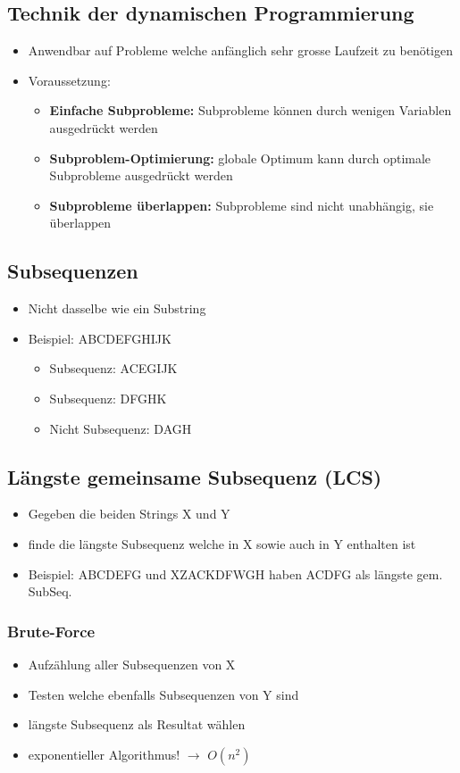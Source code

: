 \subsection{Technik der dynamischen Programmierung}
\begin{itemize}
    \item Anwendbar auf Probleme welche anfänglich sehr grosse Laufzeit zu benötigen
    \item Voraussetzung:
    \begin{itemize}
        \item \textbf{Einfache Subprobleme:} Subprobleme können durch wenigen Variablen ausgedrückt werden
        \item \textbf{Subproblem-Optimierung:} globale Optimum kann durch optimale Subprobleme ausgedrückt werden
        \item \textbf{Subprobleme überlappen: }Subprobleme sind nicht unabhängig, sie überlappen
    \end{itemize}
\end{itemize}

\subsection{Subsequenzen}
\begin{itemize}
    \item Nicht dasselbe wie ein Substring
    \item Beispiel: ABCDEFGHIJK
    \begin{itemize}
        \item Subsequenz: ACEGIJK
        \item Subsequenz: DFGHK
        \item Nicht Subsequenz: DAGH
    \end{itemize}
\end{itemize}

\subsection{Längste gemeinsame Subsequenz (LCS)}
\begin{itemize}
    \item Gegeben die beiden Strings X und Y
    \item finde die längste Subsequenz welche in X sowie auch in Y enthalten ist
    \item Beispiel: ABCDEFG und XZACKDFWGH haben ACDFG als längste gem. SubSeq.
\end{itemize}
\subsubsection{Brute-Force}
\begin{itemize}
    \item Aufzählung aller Subsequenzen von X
    \item Testen welche ebenfalls Subsequenzen von Y sind
    \item längste Subsequenz als Resultat wählen
    \item exponentieller Algorithmus! $\rightarrow$ $O(n^2)$
\end{itemize}
